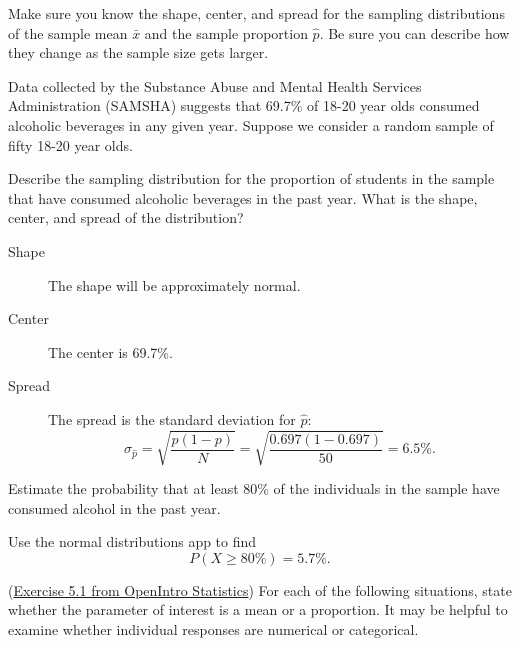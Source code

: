 \documentclass[12pt]{exam}
\newcounter{countA}
\begin{document}
Make sure you know the shape, center, and spread for the sampling
distributions of the sample mean \(\bar{x}\) and the sample proportion
\(\hat{p}\). Be sure you can describe how they change as the sample size
gets larger.

\begin{questions}
\setcounter{question}{\value{countA}}

\item
  Data collected by the Substance Abuse and Mental Health Services
  Administration (SAMSHA) suggests that 69.7\% of 18-20 year olds
  consumed alcoholic beverages in any given year. Suppose we consider a
  random sample of fifty 18-20 year olds.

  \begin{parts}
  \item
    Describe the sampling distribution for the proportion of students in the sample that have
    consumed alcoholic beverages in the past year. What is the shape,
    center, and spread of the distribution?
\begin{solution}
\begin{description}
\item[Shape] The shape will be approximately normal.
\item[Center] The center is 69.7\%.
\item[Spread] The spread is the standard deviation for $\hat{p}$:
$$\sigma_{\hat{p}} = \sqrt{\frac{p(1-p)}{N}} = \sqrt{\frac{0.697(1 - 0.697)}{50}} = 6.5\%.$$
\end{description}
\end{solution}
\vfill
  \item
    Estimate the probability that at least 80\% of the individuals in
    the sample have consumed alcohol in the past year.
\begin{solution}
Use the normal distributions app to find
$$P(X \ge 80\%) = 5.7\%.$$
\end{solution}
\vfill
  \end{parts}
\item
  (\href{http://people.hsc.edu/faculty-staff/blins/books/OpenIntroStats4e.pdf\#eoce.5.1}{Exercise 5.1 from OpenIntro Statistics}) For each of the following situations, state whether the
  parameter of interest is a mean or a proportion. It may be helpful to
  examine whether individual responses are numerical or categorical.


\end{questions}
\end{document}
